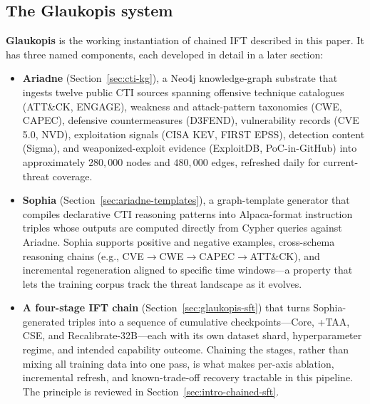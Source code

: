 \documentclass[webpdf,contemporary,large]{oup-authoring-template}
\theoremstyle{thmstyleone}
\theoremstyle{thmstyletwo}
\theoremstyle{thmstylethree}
\begin{document}
\subsection{The Glaukopis system}
\label{sec:intro-the-glaukopis-system}
\textbf{Glaukopis} is the working instantiation of chained IFT described in this paper. It has three named components, each developed in detail in a later section:

\begin{itemize}
  \item \textbf{Ariadne} (Section~\ref{sec:cti-kg}), a Neo4j knowledge-graph substrate that ingests twelve public CTI sources spanning offensive technique catalogues (ATT\&CK, ENGAGE), weakness and attack-pattern taxonomies (CWE, CAPEC), defensive countermeasures (D3FEND), vulnerability records (CVE 5.0, NVD), exploitation signals (CISA KEV, FIRST EPSS), detection content (Sigma), and weaponized-exploit evidence (ExploitDB, PoC-in-GitHub) into approximately $280{,}000$ nodes and $480{,}000$ edges, refreshed daily for current-threat coverage.

  \item \textbf{Sophia} (Section~\ref{sec:ariadne-templates}), a graph-template generator that compiles declarative CTI reasoning patterns into Alpaca-format instruction triples whose outputs are computed directly from Cypher queries against Ariadne. Sophia supports positive and negative examples, cross-schema reasoning chains (e.g., CVE$\to$CWE$\to$CAPEC$\to$ATT\&CK), and incremental regeneration aligned to specific time windows---a property that lets the training corpus track the threat landscape as it evolves.

  \item \textbf{A four-stage IFT chain} (Section~\ref{sec:glaukopis-sft}) that turns Sophia-generated triples into a sequence of cumulative checkpoints---Core, +TAA, CSE, and Recalibrate-32B---each with its own dataset shard, hyperparameter regime, and intended capability outcome. Chaining the stages, rather than mixing all training data into one pass, is what makes per-axis ablation, incremental refresh, and known-trade-off recovery tractable in this pipeline. The principle is reviewed in Section~\ref{sec:intro-chained-sft}.
\end{itemize}
\end{document}
